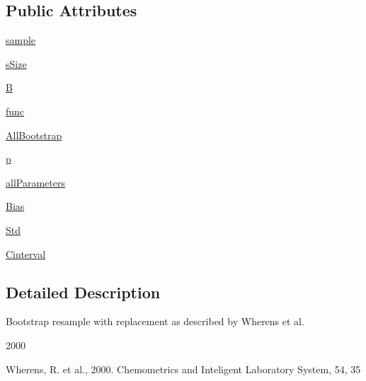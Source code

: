 \subsection*{Public Attributes}
\begin{DoxyCompactItemize}
\item 
\hyperlink{classpybootstrap_1_1pybootstrap_1_1bootstrap_ad1f21eb85a2841ab60b55828604dd268}{sample}
\item 
\hyperlink{classpybootstrap_1_1pybootstrap_1_1bootstrap_ace79fbf110c7059374909d987a05d1c4}{s\-Size}
\item 
\hyperlink{classpybootstrap_1_1pybootstrap_1_1bootstrap_a1653117224ac68ee6009eca5425d8003}{B}
\item 
\hyperlink{classpybootstrap_1_1pybootstrap_1_1bootstrap_a2cb90c46779425a34fca9810ee4d6c4b}{func}
\item 
\hyperlink{classpybootstrap_1_1pybootstrap_1_1bootstrap_a8506a391f086920b1431ebdd0158055b}{All\-Bootstrap}
\item 
\hyperlink{classpybootstrap_1_1pybootstrap_1_1bootstrap_acfa5a08574d69da3ce05a14ca9521595}{p}
\item 
\hyperlink{classpybootstrap_1_1pybootstrap_1_1bootstrap_a122a639d5215a9ef594e2d5db811cfd3}{all\-Parameters}
\item 
\hyperlink{classpybootstrap_1_1pybootstrap_1_1bootstrap_a321937e3ce1389604c2f5f8ccc637859}{Bias}
\item 
\hyperlink{classpybootstrap_1_1pybootstrap_1_1bootstrap_a1ba773408de92cc8934a446a857b50c9}{Std}
\item 
\hyperlink{classpybootstrap_1_1pybootstrap_1_1bootstrap_a7de8aee6c0d1bb9d59f98db4a48ef019}{Cinterval}
\end{DoxyCompactItemize}


\subsection{Detailed Description}
Bootstrap resample with replacement as described by Wherens et al. 

2000

Wherens, R. et al., 2000. Chemometrics and Inteligent Laboratory System, 54, 35 

